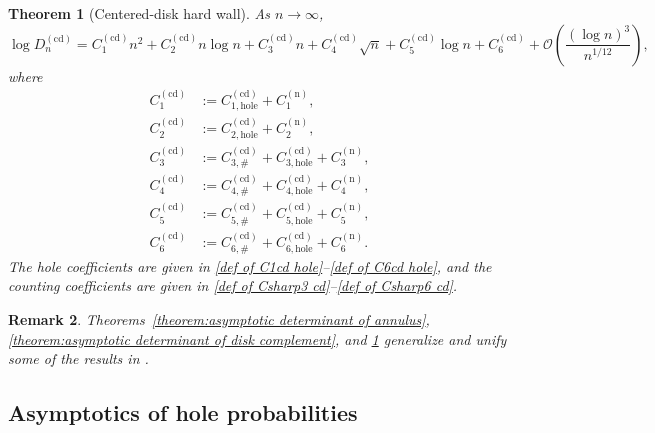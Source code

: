 \documentclass[a4paper]{article}
\newtheorem{theorem}{Theorem}[section]
\newtheorem{remark}[theorem]{Remark}
\numberwithin{equation}{section}
\begin{document}
\begin{theorem}[Centered-disk hard wall]
\label{theorem:asymptotic determinant of centered disk}
As $n\to\infty$,
\begin{equation}
\log D_n^{(\mathrm{cd})}
=C_1^{(\mathrm{cd})}n^2
+C_2^{(\mathrm{cd})}n\log n
+C_3^{(\mathrm{cd})}n
+C_4^{(\mathrm{cd})}\sqrt n
+C_5^{(\mathrm{cd})}\log n
+C_6^{(\mathrm{cd})}
+\mathcal O\!\left(\frac{(\log n)^3}{n^{1/12}}\right),
\end{equation}
where
\begin{align}
\label{def of C1 Dn cd}
C_1^{(\mathrm{cd})}
&:=C_{1,\mathrm{hole}}^{(\mathrm{cd})}+C_1^{(\mathrm n)},
\\
\label{def of C2 Dn cd}
C_2^{(\mathrm{cd})}
&:=C_{2,\mathrm{hole}}^{(\mathrm{cd})}+C_2^{(\mathrm n)},
\\
\label{def of C3 Dn cd}
C_3^{(\mathrm{cd})}
&:=C_{3,\#}^{(\mathrm{cd})}+C_{3,\mathrm{hole}}^{(\mathrm{cd})}+C_3^{(\mathrm n)},
\\
\label{def of C4 Dn cd}
C_4^{(\mathrm{cd})}
&:=C_{4,\#}^{(\mathrm{cd})}+C_{4,\mathrm{hole}}^{(\mathrm{cd})}+C_4^{(\mathrm n)},
\\
\label{def of C5 Dn cd}
C_5^{(\mathrm{cd})}
&:=C_{5,\#}^{(\mathrm{cd})}+C_{5,\mathrm{hole}}^{(\mathrm{cd})}+C_5^{(\mathrm n)},
\\
\label{def of C6 Dn cd}
C_6^{(\mathrm{cd})}
&:=C_{6,\#}^{(\mathrm{cd})}+C_{6,\mathrm{hole}}^{(\mathrm{cd})}+C_6^{(\mathrm n)}.
\end{align}
The hole coefficients are given in \eqref{def of C1cd hole}--\eqref{def of C6cd hole}, and the counting coefficients are given in \eqref{def of Csharp3 cd}--\eqref{def of Csharp6 cd}.
\end{theorem}



\begin{remark}
Theorems~\ref{theorem:asymptotic determinant of annulus}, \ref{theorem:asymptotic determinant of disk complement}, and \ref{theorem:asymptotic determinant of centered disk} generalize and unify some of the results in \cite{C2021,C2021 FH,ACCL1,ACCL2,CL2023}.  
\end{remark}


\subsection{Asymptotics of hole probabilities}
\label{subsection:precise-hole-probabilities}
\end{document}
